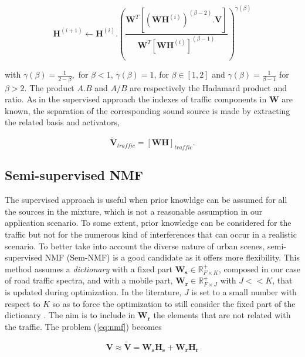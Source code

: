 \documentclass[twocolumn]{svjour3}          %
\begin{document}
\begin{equation}\label{eq:updateH_Sup}
\textbf{H}^{(i+1)} \leftarrow \textbf{H}^{(i)}.\left(\frac{\textbf{W}^T \left[\left(\textbf{WH}^{(i)} \right)^{(\beta-2)}.\textbf{V} \right]}{\textbf{W}^T \left[\textbf{WH}^{(i)} \right]^{(\beta-1)}}\right)^{\gamma(\beta)}
\end{equation}

with $\gamma(\beta) = \frac{1}{2-\beta},$ for $\beta < 1$, $ \gamma(\beta) = 1$, for $\beta \in \left[1,2\right]$ and $\gamma(\beta) = \frac{1}{\beta-1}$ for $\beta > 2$. The product $A.B$ and $A/B$ are respectively the Hadamard product and ratio. As in the supervised approach the indexes of traffic components in $\mathbf{W}$  are known, the separation of the corresponding sound source is made by extracting the related basis and activators,

\begin{equation}\label{eq:separationExtraction}
\mathbf{\tilde{V}}_{traffic} = \left[ \mathbf{WH} \right]_{traffic}.
\end{equation}

\subsection{Semi-supervised NMF}

The supervised approach is useful when prior knowldge can be assumed for all the sources in the mixture, which is not a reasonable assumption in our application scenario. To some extent, prior knowledge can be considered for the traffic but not for the numerous kind of interferences that can occur in a realistic scenario. To better take into account the diverse nature of urban scenes, semi-supervised NMF (Sem-NMF)\cite{lee_semi-supervised_2010} is a good candidate as it offers more flexibility. This method assumes a \textit{dictionary} with a fixed part $\mathbf{W_s} \in \mathbb{R}^+_{F\times K}$, composed in our case of road traffic spectra, and with a mobile part, $\mathbf{W_r} \in \mathbb{R}^+_{F\times J}$ with $J <<K$, that is updated during optimization. In the literature, $J$ is set to a small number with respect to $K$ so as to force the optimization to still consider the fixed part of the dictionary \cite{lefevre2012semi}. The aim is to include in $\mathbf{W_r}$ the elements that are not related with the traffic. The problem (\ref{eq:nmf}) becomes

\begin{equation}
\mathbf{V} \approx \mathbf{\tilde{V}} = \mathbf{W_s H_s}+ \mathbf{W_r H_r}
\end{equation}
\end{document}
